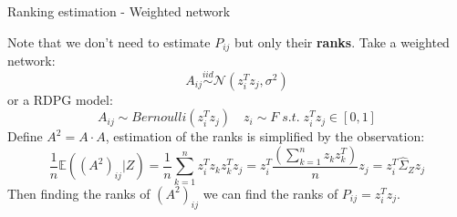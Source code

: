 \documentclass[10.5pt]{beamer}
\begin{document}

\begin{frame}{Ranking estimation - Weighted network}

Note that we don't need to estimate $P_{ij}$ but only their \textbf{ranks}. 
Take a weighted network:
\[
A_{ij} \overset{iid}{\sim}\mathcal{N}(z_i^T z_j, \sigma^2)
\]
or a RDPG model:
\[
A_{ij}\sim Bernoulli(z_i^T z_j) \quad z_i
\sim F \; s.t. \; z_i^T z_j\in [0, 1]
\]
Define $A^2= A\cdot A$, estimation of the ranks is simplified by the observation:
\[
\frac{1}{n}\mathbb{E}((A^2)_{ij}|Z) = \frac{1}{n}\sum_{k=1}^n z_i^T z_k z_k^T z_j = z_i^T \frac{\left(\sum_{k=1}^{n}z_{k}z_{k}^{T}\right)}{n}z_{j} = z_{i}^{T} \hat{\Sigma}_Z z_{j}
\]
Then finding the ranks of $(A^2)_{ij}$ we can find the ranks of $P_{ij}=z_i^T z_j$.
\end{frame}





\end{document}
